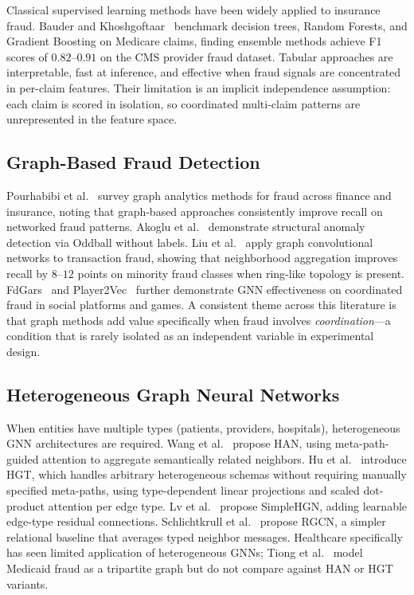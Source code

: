 \documentclass[pdflatex,sn-mathphys-num]{sn-jnl}
\theoremstyle{thmstyleone}
\theoremstyle{thmstyletwo}
\theoremstyle{thmstylethree}
\begin{document}
Classical supervised learning methods have been widely applied to
insurance fraud. Bauder and Khoshgoftaar~\cite{bauder2017} benchmark
decision trees, Random Forests, and Gradient Boosting on Medicare
claims, finding ensemble methods achieve F1 scores of $0.82$--$0.91$
on the CMS provider fraud dataset. Tabular approaches are
interpretable, fast at inference, and effective when fraud signals are
concentrated in per-claim features. Their limitation is an implicit
independence assumption: each claim is scored in isolation, so
coordinated multi-claim patterns are unrepresented in the feature space.

\subsection{Graph-Based Fraud Detection}

Pourhabibi et al.~\cite{pourhabibi2020} survey graph analytics methods
for fraud across finance and insurance, noting that graph-based
approaches consistently improve recall on networked fraud patterns.
Akoglu et al.~\cite{akoglu2015} demonstrate structural anomaly
detection via Oddball without labels. Liu et al.~\cite{liu2021} apply
graph convolutional networks to transaction fraud, showing that
neighborhood aggregation improves recall by $8$--$12$ points on
minority fraud classes when ring-like topology is present. FdGars~\cite{wang2019spam} and
Player2Vec~\cite{zhang2019} further demonstrate GNN effectiveness on
coordinated fraud in social platforms and games. A consistent theme
across this literature is that graph methods add value specifically
when fraud involves \emph{coordination}---a condition that is rarely
isolated as an independent variable in experimental design.

\subsection{Heterogeneous Graph Neural Networks}

When entities have multiple types (patients, providers, hospitals),
heterogeneous GNN architectures are required. Wang et
al.~\cite{wang2019han} propose HAN, using meta-path-guided attention to
aggregate semantically related neighbors. Hu et al.~\cite{hu2020hgt}
introduce HGT, which handles arbitrary heterogeneous schemas without
requiring manually specified meta-paths, using type-dependent linear
projections and scaled dot-product attention per edge type. Lv et
al.~\cite{lv2021} propose SimpleHGN, adding learnable edge-type
residual connections. Schlichtkrull et al.~\cite{schlichtkrull2018}
propose RGCN, a simpler relational baseline that averages typed
neighbor messages. Healthcare specifically has seen limited application
of heterogeneous GNNs; Tiong et al.~\cite{tiong2021} model
Medicaid fraud as a tripartite graph but do not compare against HAN or
HGT variants.
\end{document}

